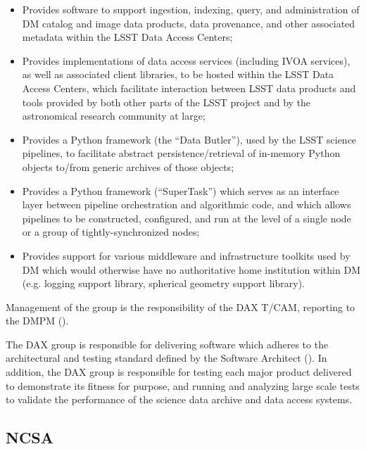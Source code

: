 \begin{itemize}

  \item{Provides software to support ingestion, indexing, query, and administration of \gls{DM} catalog and image
  data products, data \gls{provenance}, and other associated \gls{metadata} within the \gls{LSST} Data Access Centers;}

  \item{Provides implementations of data access services (including \gls{IVOA} services), as well as associated
  client libraries, to be hosted within the \gls{LSST} Data Access Centers, which facilitate interaction between
  \gls{LSST} data products and tools provided by both other parts of the \gls{LSST} project and by the astronomical
  research community at large;}

  \item{Provides a Python framework (the ``Data \gls{Butler}''), used by the \gls{LSST} science pipelines, to facilitate
  abstract persistence/retrieval of in-memory Python objects to/from generic archives of those objects;}

  \item{Provides a Python framework (``SuperTask'') which serves as an interface layer between \gls{pipeline}
  orchestration and algorithmic code, and which allows pipelines to be constructed, configured, and run at
  the level of a single node or a group of tightly-synchronized nodes;}

  \item{Provides support for various middleware and infrastructure toolkits used by \gls{DM} which would otherwise
  have no authoritative home institution within DM (e.g. logging support library, spherical geometry support
  library).}

\end{itemize}

Management of the group is the responsibility of the \gls{DAX} \gls{T/CAM}, reporting to the \gls{DMPM} ().

The \gls{DAX} group is responsible for delivering software which adheres to the architectural and testing standard
defined by the Software Architect (). In addition, the \gls{DAX} group is responsible for
testing each major product delivered to demonstrate its fitness for purpose, and running and analyzing large
scale tests to validate the performance of the science data archive and data access systems.

\subsection {NCSA\label{sect:ncsa}}


